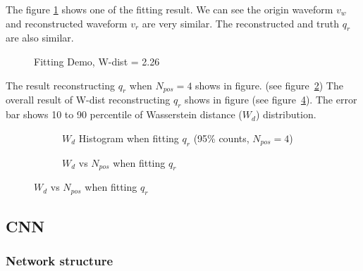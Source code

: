 The figure \ref{fig:fitting} shows one of the fitting result. We can see the origin waveform $v_{w}$ and reconstructed waveform $v_{r}$ are very similar. The reconstructed and truth $q_{r}$ are also similar. 
\begin{figure}[H]
    \centering
    \scalebox{0.4}{}
    \caption{\label{fig:fitting} Fitting Demo, W-dist = 2.26}
\end{figure}

The result reconstructing $q_{r}$ when $N_{pos}=4$ shows in figure. (see figure~\ref{fig:fitting-hist}) The overall result of W-dist reconstructing $q_{r}$ shows in figure (see figure~\ref{fig:fitting-npos}). The error bar shows 10 to 90 percentile of Wasserstein distance ($W_{d}$) distribution. 

\begin{figure}[H]
\begin{minipage}[t]{.5\textwidth}
\begin{figure}[H]
    \centering
    \resizebox{\textwidth}{!}{}
    \caption{\label{fig:fitting-hist} $W_{d}$ Histogram when fitting $q_{r}$ (95\% counts, $N_{pos}=4$)}
\end{figure}
\end{minipage}
\begin{minipage}[t]{.5\textwidth}
\begin{figure}[H]
    \centering
    \resizebox{\textwidth}{!}{}
    \caption{\label{fig:fitting-npos} $W_{d}$ vs $N_{pos}$ when fitting $q_{r}$}
\end{figure}
\end{minipage}
\end{figure}

\subsection{CNN}

\subsubsection{Network structure}

